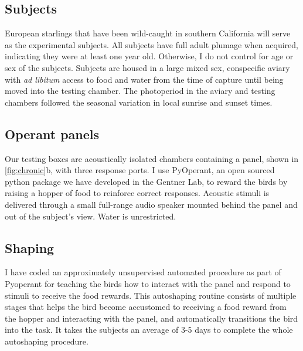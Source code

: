 \subsection{Subjects}
European starlings that have been wild-caught in southern California will serve as the experimental subjects. All subjects have full adult plumage when acquired, indicating they were at least one year old. Otherwise, I do not control for age or sex of the subjects. Subjects are housed in a large mixed sex, conspecific aviary with \textit{ad libitum} access to food and water from the time of capture until being moved into the testing chamber. The photoperiod in the aviary and testing chambers followed the seasonal variation in local sunrise and sunset times.

\subsection{Operant panels}
Our testing boxes are acoustically isolated chambers containing a panel, shown in \ref{fig:chronic}b, with three response ports. I use PyOperant, an open sourced python package we have developed in the Gentner Lab, to reward the birds by raising a hopper of food to reinforce correct responses. Acoustic stimuli is delivered through a small full-range audio speaker mounted behind the panel and out of the subject's view. Water is unrestricted.

\subsection{Shaping}
I have coded an approximately unsupervised automated procedure as part of Pyoperant for teaching the birds how to interact with the panel and respond to stimuli to receive the food rewards. This autoshaping routine\cite{brown1968auto} consists of multiple stages that helps the bird become accustomed to receiving a food reward from the hopper and interacting with the panel, and automatically transitions the bird into the task. It takes the subjects an average of 3-5 days to complete the whole autoshaping procedure.

